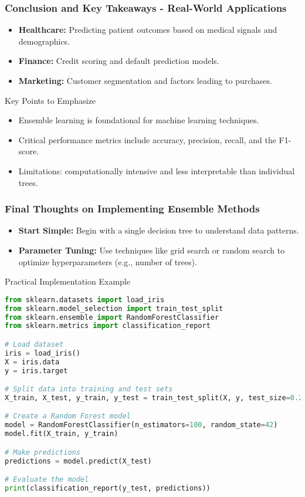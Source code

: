 \documentclass[aspectratio=169]{beamer}
\begin{document}
\begin{frame}[fragile]
    \frametitle{Conclusion and Key Takeaways - Real-World Applications}
    \begin{itemize}
        \item \textbf{Healthcare:} Predicting patient outcomes based on medical signals and demographics.
        \item \textbf{Finance:} Credit scoring and default prediction models.
        \item \textbf{Marketing:} Customer segmentation and factors leading to purchases.
    \end{itemize}
    
    \begin{block}{Key Points to Emphasize}
        \begin{itemize}
            \item Ensemble learning is foundational for machine learning techniques.
            \item Critical performance metrics include accuracy, precision, recall, and the F1-score.
            \item Limitations: computationally intensive and less interpretable than individual trees.
        \end{itemize}
    \end{block}
\end{frame}

\begin{frame}[fragile]
    \frametitle{Final Thoughts on Implementing Ensemble Methods}
    \begin{itemize}
        \item \textbf{Start Simple:} Begin with a single decision tree to understand data patterns.
        \item \textbf{Parameter Tuning:} Use techniques like grid search or random search to optimize hyperparameters (e.g., number of trees).
    \end{itemize}

    \begin{block}{Practical Implementation Example}
    \begin{lstlisting}[language=Python]
from sklearn.datasets import load_iris
from sklearn.model_selection import train_test_split
from sklearn.ensemble import RandomForestClassifier
from sklearn.metrics import classification_report

# Load dataset
iris = load_iris()
X = iris.data
y = iris.target

# Split data into training and test sets
X_train, X_test, y_train, y_test = train_test_split(X, y, test_size=0.2, random_state=42)

# Create a Random Forest model
model = RandomForestClassifier(n_estimators=100, random_state=42)
model.fit(X_train, y_train)

# Make predictions
predictions = model.predict(X_test)

# Evaluate the model
print(classification_report(y_test, predictions))
    \end{lstlisting}
    \end{block}
\end{frame}
\end{document}
